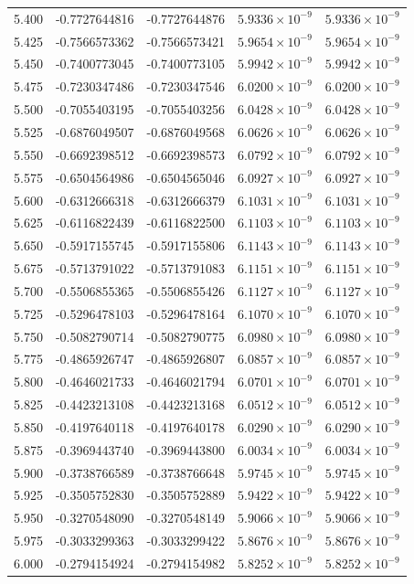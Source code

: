 \documentclass[11pt,a4paper]{article}
\begin{document}
\begin{longtable}{rrrrr}
5.400 & -0.7727644816 & -0.7727644876 & $5.9336\times 10^{-9}$ & $5.9336\times 10^{-9}$ \\
5.425 & -0.7566573362 & -0.7566573421 & $5.9654\times 10^{-9}$ & $5.9654\times 10^{-9}$ \\
5.450 & -0.7400773045 & -0.7400773105 & $5.9942\times 10^{-9}$ & $5.9942\times 10^{-9}$ \\
5.475 & -0.7230347486 & -0.7230347546 & $6.0200\times 10^{-9}$ & $6.0200\times 10^{-9}$ \\
5.500 & -0.7055403195 & -0.7055403256 & $6.0428\times 10^{-9}$ & $6.0428\times 10^{-9}$ \\
5.525 & -0.6876049507 & -0.6876049568 & $6.0626\times 10^{-9}$ & $6.0626\times 10^{-9}$ \\
5.550 & -0.6692398512 & -0.6692398573 & $6.0792\times 10^{-9}$ & $6.0792\times 10^{-9}$ \\
5.575 & -0.6504564986 & -0.6504565046 & $6.0927\times 10^{-9}$ & $6.0927\times 10^{-9}$ \\
5.600 & -0.6312666318 & -0.6312666379 & $6.1031\times 10^{-9}$ & $6.1031\times 10^{-9}$ \\
5.625 & -0.6116822439 & -0.6116822500 & $6.1103\times 10^{-9}$ & $6.1103\times 10^{-9}$ \\
5.650 & -0.5917155745 & -0.5917155806 & $6.1143\times 10^{-9}$ & $6.1143\times 10^{-9}$ \\
5.675 & -0.5713791022 & -0.5713791083 & $6.1151\times 10^{-9}$ & $6.1151\times 10^{-9}$ \\
5.700 & -0.5506855365 & -0.5506855426 & $6.1127\times 10^{-9}$ & $6.1127\times 10^{-9}$ \\
5.725 & -0.5296478103 & -0.5296478164 & $6.1070\times 10^{-9}$ & $6.1070\times 10^{-9}$ \\
5.750 & -0.5082790714 & -0.5082790775 & $6.0980\times 10^{-9}$ & $6.0980\times 10^{-9}$ \\
5.775 & -0.4865926747 & -0.4865926807 & $6.0857\times 10^{-9}$ & $6.0857\times 10^{-9}$ \\
5.800 & -0.4646021733 & -0.4646021794 & $6.0701\times 10^{-9}$ & $6.0701\times 10^{-9}$ \\
5.825 & -0.4423213108 & -0.4423213168 & $6.0512\times 10^{-9}$ & $6.0512\times 10^{-9}$ \\
5.850 & -0.4197640118 & -0.4197640178 & $6.0290\times 10^{-9}$ & $6.0290\times 10^{-9}$ \\
5.875 & -0.3969443740 & -0.3969443800 & $6.0034\times 10^{-9}$ & $6.0034\times 10^{-9}$ \\
5.900 & -0.3738766589 & -0.3738766648 & $5.9745\times 10^{-9}$ & $5.9745\times 10^{-9}$ \\
5.925 & -0.3505752830 & -0.3505752889 & $5.9422\times 10^{-9}$ & $5.9422\times 10^{-9}$ \\
5.950 & -0.3270548090 & -0.3270548149 & $5.9066\times 10^{-9}$ & $5.9066\times 10^{-9}$ \\
5.975 & -0.3033299363 & -0.3033299422 & $5.8676\times 10^{-9}$ & $5.8676\times 10^{-9}$ \\
6.000 & -0.2794154924 & -0.2794154982 & $5.8252\times 10^{-9}$ & $5.8252\times 10^{-9}$ \\
\end{longtable}
\endgroup
\clearpage
\end{document}
